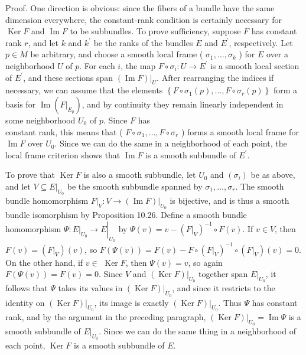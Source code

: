 \documentclass[10pt]{article}
\begin{document}
Proof. One direction is obvious: since the fibers of a bundle have the same dimension everywhere, the constant-rank condition is certainly necessary for $\operatorname{Ker} F$ and $\operatorname{Im} F$ to be subbundles. To prove sufficiency, suppose $F$ has constant rank $r$, and let $k$ and $k^{\prime}$ be the ranks of the bundles $E$ and $E^{\prime}$, respectively. Let $p \in M$ be arbitrary, and choose a smooth local frame ( $\sigma_{1}, \ldots, \sigma_{k}$ ) for $E$ over a neighborhood $U$ of $p$. For each $i$, the map $F \circ \sigma_{i}: U \rightarrow E^{\prime}$ is a smooth local section of $E^{\prime}$, and these sections span $\left.(\operatorname{Im} F)\right|_{U}$. After rearranging the indices if necessary, we can assume that the elements $\left\{F \circ \sigma_{1}(p), \ldots, F \circ \sigma_{r}(p)\right\}$ form a basis for $\operatorname{Im}\left(\left.F\right|_{E_{p}}\right)$, and by continuity they remain linearly independent in some neighborhood $U_{0}$ of $p$. Since $F$ has\\
constant rank, this means that ( $F \circ \sigma_{1}, \ldots, F \circ \sigma_{r}$ ) forms a smooth local frame for $\operatorname{Im} F$ over $U_{0}$. Since we can do the same in a neighborhood of each point, the local frame criterion shows that $\operatorname{Im} F$ is a smooth subbundle of $E^{\prime}$.

To prove that $\operatorname{Ker} F$ is also a smooth subbundle, let $U_{0}$ and $\left(\sigma_{i}\right)$ be as above, and let $\left.V \subseteq E\right|_{U_{0}}$ be the smooth subbundle spanned by $\sigma_{1}, \ldots, \sigma_{r}$. The smooth bundle homomorphism $\left.F\right|_{V}:\left.V \rightarrow(\operatorname{Im} F)\right|_{U_{0}}$ is bijective, and is thus a smooth bundle isomorphism by Proposition 10.26. Define a smooth bundle homomorphism $\Psi:\left.\left.E\right|_{U_{0}} \rightarrow E\right|_{U_{0}}$ by $\Psi(v)=v-\left(\left.F\right|_{V}\right)^{-1} \circ F(v)$. If $v \in V$, then $F(v)=\left(\left.F\right|_{V}\right)(v)$, so $F(\Psi(v))=F(v)-F \circ\left(\left.F\right|_{V}\right)^{-1} \circ\left(\left.F\right|_{V}\right)(v)=0$. On the other hand, if $v \in$ $\operatorname{Ker} F$, then $\Psi(v)=v$, so again $F(\Psi(v))=F(v)=0$. Since $V$ and $\left.(\operatorname{Ker} F)\right|_{U_{0}}$ together span $\left.E\right|_{U_{0}}$, it follows that $\Psi$ takes its values in $\left.(\operatorname{Ker} F)\right|_{U_{0}}$, and since it restricts to the identity on $\left.(\operatorname{Ker} F)\right|_{U_{0}}$, its image is exactly $\left.(\operatorname{Ker} F)\right|_{U_{0}}$. Thus $\Psi$ has constant rank, and by the argument in the preceding paragraph, $\left.(\operatorname{Ker} F)\right|_{U_{0}}=\operatorname{Im} \Psi$ is a smooth subbundle of $\left.E\right|_{U_{0}}$. Since we can do the same thing in a neighborhood of each point, $\operatorname{Ker} F$ is a smooth subbundle of $E$.
\end{document}
